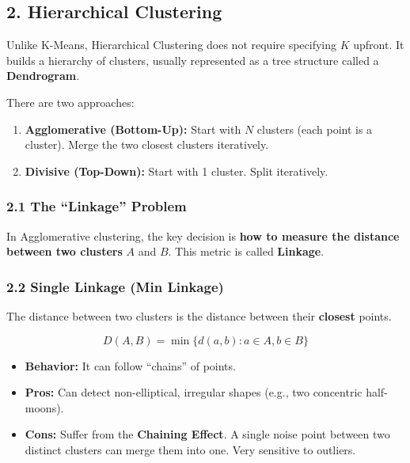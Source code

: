 \documentclass[
  italian,
  11pt,
]{article}
\begin{document}
\subsection{2. Hierarchical Clustering}\label{hierarchical-clustering}

Unlike K-Means, Hierarchical Clustering does not require specifying
\(K\) upfront. It builds a hierarchy of clusters, usually represented as
a tree structure called a \textbf{Dendrogram}.

There are two approaches:

\begin{enumerate}
\def\labelenumi{\arabic{enumi}.}
\item
  \textbf{Agglomerative (Bottom-Up):} Start with \(N\) clusters (each
  point is a cluster). Merge the two closest clusters iteratively.
\item
  \textbf{Divisive (Top-Down):} Start with 1 cluster. Split iteratively.
\end{enumerate}

\subsubsection{2.1 The ``Linkage'' Problem}\label{the-linkage-problem}

In Agglomerative clustering, the key decision is \textbf{how to measure
the distance between two clusters} \(A\) and \(B\). This metric is
called \textbf{Linkage}.

\subsubsection{2.2 Single Linkage (Min
Linkage)}\label{single-linkage-min-linkage}

The distance between two clusters is the distance between their
\textbf{closest} points.

\[D(A, B) = \min \{ d(a, b) : a \in A, b \in B \}\]

\begin{itemize}
\item
  \textbf{Behavior:} It can follow ``chains'' of points.
\item
  \textbf{Pros:} Can detect non-elliptical, irregular shapes (e.g., two
  concentric half-moons).
\item
  \textbf{Cons:} Suffer from the \textbf{Chaining Effect}. A single
  noise point between two distinct clusters can merge them into one.
  Very sensitive to outliers.
\end{itemize}
\end{document}
